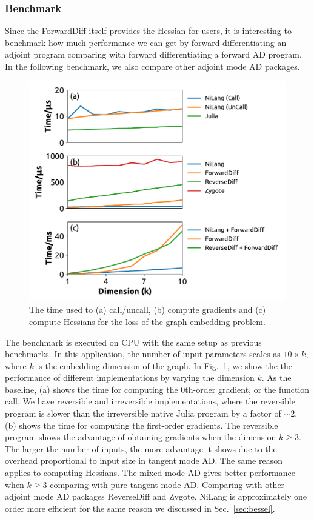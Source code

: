 \documentclass{article}
\newcommand{\<}{\langle}
\renewcommand{\>}{\rangle}
\newcommand{\Fig}[1]{Fig.~\ref{#1}}
\newcommand{\Sec}[1]{Sec.~\ref{#1}}
\theoremstyle{definition}\newtheorem{definition}{\textit{Definition}}
\begin{document}
\subsubsection{Benchmark}
Since the ForwardDiff itself provides the Hessian for users, it is interesting to benchmark how much performance we can get by forward differentiating an adjoint program comparing with forward differentiating a forward AD program. In the following benchmark, we also compare other adjoint mode AD packages.
\begin{figure}
    \centerline{\includegraphics[width=0.8\columnwidth,trim={0 0 0 0},clip]{fig7.pdf}}
    \caption{The time used to (a) call/uncall, (b) compute gradients and (c) compute Hessians for the loss of the graph embedding problem.}\label{fig:bench-embedding}
\end{figure}
The benchmark is executed on CPU with the same setup as previous benchmarks.
In this application, the number of input parameters scales as $10 \times k$, where $k$ is the embedding dimension of the graph.
In \Fig{fig:bench-embedding}, we show the the performance of different implementations by varying the dimension $k$.
As the baseline, (a) shows the time for computing the 0th-order gradient, or the function call. We have reversible and irreversible implementations, where the reversible program is slower than the irreversible native Julia program by a factor of $\sim2$.
(b) shows the time for computing the first-order gradients. The reversible program shows the advantage of obtaining gradients when the dimension $k \geq 3$. The larger the number of inputs, the more advantage it shows due to the overhead proportional to input size in tangent mode AD.
The same reason applies to computing Hessians. The mixed-mode AD gives better performance when $k \geq 3$ comparing with pure tangent mode AD.
Comparing with other adjoint mode AD packages ReverseDiff and Zygote, NiLang is approximately one order more efficient for the same reason we discussed in \Sec{sec:bessel}.
\end{document}
